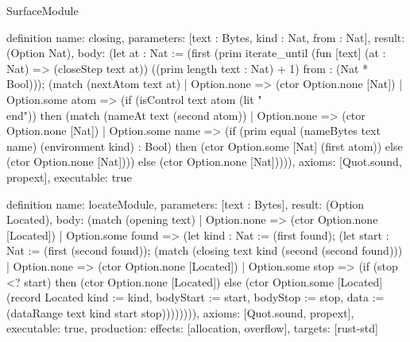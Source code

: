 \begin{lexlean}{SurfaceModule}
\begin{semanticmodule}
definition{
  name: closing,
  parameters: [text : Bytes, kind : Nat, from : Nat],
  result: (Option Nat),
  body: (let at : Nat := (first (prim iterate_until (fun [text] (at : Nat) => (closeStep text at)) ((prim length text : Nat) + 1) from : (Nat * Bool))); (match (nextAtom text at)
    | Option.none => (ctor Option.none [Nat])
    | Option.some atom => (if (isControl text atom (lit "\\end")) then (match (nameAt text (second atom))
      | Option.none => (ctor Option.none [Nat])
      | Option.some name => (if (prim equal (nameBytes text name) (environment kind) : Bool) then (ctor Option.some [Nat] (first atom)) else (ctor Option.none [Nat]))) else (ctor Option.none [Nat])))),
  axioms: [Quot.sound, propext],
  executable: true
}

definition{
  name: locateModule,
  parameters: [text : Bytes],
  result: (Option Located),
  body: (match (opening text)
    | Option.none => (ctor Option.none [Located])
    | Option.some found => (let kind : Nat := (first found); (let start : Nat := (first (second found)); (match (closing text kind (second (second found)))
      | Option.none => (ctor Option.none [Located])
      | Option.some stop => (if (stop <? start) then (ctor Option.none [Located]) else (ctor Option.some [Located] (record Located {kind := kind, bodyStart := start, bodyStop := stop, data := (dataRange text kind start stop)}))))))),
  axioms: [Quot.sound, propext],
  executable: true,
  production: {effects: [allocation, overflow], targets: [rust-std]}
}
\end{semanticmodule}
\end{lexlean}
